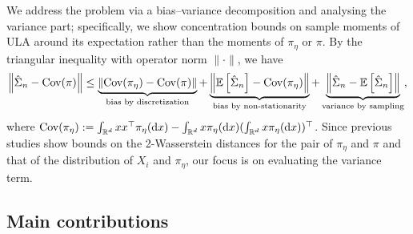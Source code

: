 \documentclass[12pt,reqno]{amsart}
\theoremstyle{remark}
\theoremstyle{definition}
\newcommand{\R}{\mathbb{R}}
\newcommand{\E}{\mathbb{E}}
\newcommand{\Cov}{\textnormal{Cov}}
\newcommand{\diff}{\mathrm{d}}
\begin{document}
We address the problem via a bias--variance decomposition and analysing the variance part; specifically, we show concentration bounds on sample moments of ULA around its expectation rather than the moments of $\pi_{\eta}$ or $\pi$.
By the triangular inequality with operator norm $\|\cdot\|$, we have
\begin{equation}\label{eq:bvd}
    \left\|\hat{\Sigma}_{n}-\Cov(\pi)\right\|
    \le \underbrace{\left\|\Cov(\pi_{\eta})-\Cov(\pi)\right\|}_{\text{bias by discretization}}
    +\underbrace{\left\|\E\left[\hat{\Sigma}_{n}\right]-\Cov(\pi_{\eta})\right\|}_{\text{bias by non-stationarity}}
    +\underbrace{\left\|\hat{\Sigma}_{n}-\E\left[\hat{\Sigma}_{n}\right]\right\|}_{\text{variance by sampling}},
\end{equation}
where $\Cov(\pi_{\eta}):=\int_{\R^{d}}xx^{\top}\pi_{\eta}(\diff x)-\int_{\R^{d}}x\pi_{\eta}(\diff x)(\int_{\R^{d}}x\pi_{\eta}(\diff x))^{\top}$.
Since previous studies \citep[e.g.,][]{durmus2019high} show bounds on the 2-Wasserstein distances for the pair of $\pi_{\eta}$ and $\pi$ and that of the distribution of $X_{i}$ and $\pi_{\eta}$, our focus is on evaluating the variance term.


\subsection{Main contributions}\label{sec:intro:contrib}
\end{document}
